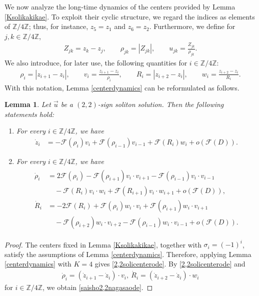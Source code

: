 \documentclass[reqno]{amsart}
\theoremstyle{plain}
\newtheorem{lemma}[theorem]{Lemma}
\theoremstyle{definition}
\numberwithin{equation}{section}
\begin{document}
We now analyze the long-time dynamics of the centers provided by Lemma \ref{Ksolikakikae}. To exploit their cyclic structure, we regard the indices as elements of $\mathbb{Z}/4\mathbb{Z}$; thus, for instance, $z_5=z_1$ and $z_6=z_2$. Furthermore, we define for $j,k\in\mathbb{Z}/4\mathbb{Z}$,
\begin{align}\label{hendef}
Z_{jk}=z_k-z_j,\qquad
\rho_{jk}=|Z_{jk}|,\qquad
u_{jk}=\frac{Z_{jk}}{\rho_{jk}}.
\end{align}
We also introduce, for later use, the following quantities for $i\in\mathbb{Z}/4\mathbb{Z}$:
\begin{align}\label{iroirodef}
\rho_i=|z_{i+1}-z_i|,\qquad
v_i=\frac{z_{i+1}-z_i}{\rho_i},\qquad
R_i=|z_{i+2}-z_i|,\qquad
w_i=\frac{z_{i+2}-z_i}{R_i}.
\end{align}
With this notation, Lemma \ref{centerdynamics} can be reformulated as follows.
\begin{lemma}\label{2,2centerlem}
Let $\vec{u}$ be a $(2,2)$-sign soliton solution. Then the following statements hold:
\begin{enumerate}
\item For every $i\in \mathbb{Z}/4\mathbb{Z}$, we have
\begin{align}\label{2,2solicenterode}
\dot{z}_i&=-\mathcal{F}(\rho_i)v_i+\mathcal{F}(\rho_{i-1})v_{i-1}+\mathcal{F}(R_i)w_i+o\left(\mathcal{F}(D)\right).
\end{align}
\item For every $i\in \mathbb{Z}/4\mathbb{Z}$, we have
\begin{align}\label{saisho2,2nagasaode}
\begin{aligned}
\dot{\rho}_i&=2\mathcal{F}(\rho_i)-\mathcal{F}(\rho_{i+1})v_i\cdot v_{i+1}-\mathcal{F}(\rho_{i-1})v_i\cdot v_{i-1}
\\
&\quad-\mathcal{F}(R_i)v_i\cdot w_i+\mathcal{F}(R_{i+1})v_i\cdot w_{i+1}+o\left(\mathcal{F}(D)\right),
\\
\dot{R}_i&=-2\mathcal{F}(R_i)+\mathcal{F}(\rho_i)w_i\cdot v_i+\mathcal{F}(\rho_{i+1})w_i\cdot v_{i+1}
\\
&\quad -\mathcal{F}(\rho_{i+2})w_i\cdot v_{i+2}-\mathcal{F}(\rho_{i-1})w_i\cdot v_{i-1}+o\left(\mathcal{F}(D)\right).
\end{aligned}
\end{align}
\end{enumerate}
\end{lemma}
\begin{proof}
The centers fixed in Lemma \ref{Ksolikakikae}, together with $\sigma_i=(-1)^i$, satisfy the assumptions of Lemma
\ref{centerdynamics}. Therefore, applying Lemma \ref{centerdynamics} with $K=4$ gives \eqref{2,2solicenterode}. By \eqref{2,2solicenterode} and
\begin{align*}
\dot{\rho}_i=\left(\dot{z}_{i+1}-\dot{z}_i\right)\cdot v_i,\ \dot{R}_i=\left(\dot{z}_{i+2}-\dot{z}_i\right)\cdot w_i
\end{align*}
for $i\in \mathbb{Z}/4\mathbb{Z}$, we obtain \eqref{saisho2,2nagasaode}.
\end{proof}
\end{document}

